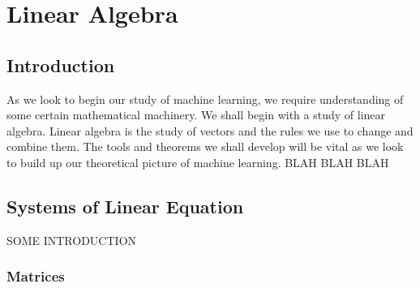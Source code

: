 \chapter{Linear Algebra}
\section{Introduction}

As we look to begin our study of machine learning, we require understanding of some certain mathematical machinery. We shall begin with a study of linear algebra.
Linear algebra is the study of vectors and the rules we use to change and combine them. The tools and theorems we shall develop will be vital as we look to build up
our theoretical picture of machine learning. BLAH BLAH BLAH


\section{Systems of Linear Equation}
SOME INTRODUCTION

\subsection{Matrices}






